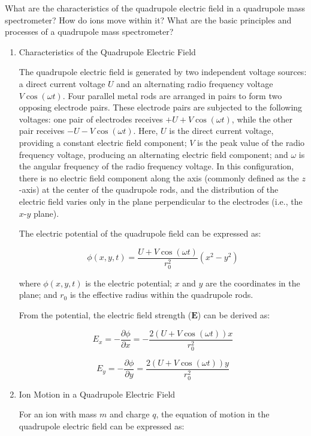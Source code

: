 \begin{question}
	What are the characteristics of the quadrupole electric field in a quadrupole mass spectrometer? How do ions move within it? What are the basic principles and processes of a quadrupole mass spectrometer?
\end{question}

\begin{enumerate}
	\item Characteristics of the Quadrupole Electric Field
	
	The quadrupole electric field is generated by two independent voltage sources: a direct current voltage \( U \) and an alternating radio frequency voltage \( V \cos(\omega t) \). Four parallel metal rods are arranged in pairs to form two opposing electrode pairs. These electrode pairs are subjected to the following voltages: one pair of electrodes receives \( +U + V \cos(\omega t) \), while the other pair receives \( -U - V \cos(\omega t) \). Here, \( U \) is the direct current voltage, providing a constant electric field component; \( V \) is the peak value of the radio frequency voltage, producing an alternating electric field component; and \( \omega \) is the angular frequency of the radio frequency voltage. In this configuration, there is no electric field component along the axis (commonly defined as the \( z \)-axis) at the center of the quadrupole rods, and the distribution of the electric field varies only in the plane perpendicular to the electrodes (i.e., the \( x \)-\( y \) plane).
	
	The electric potential of the quadrupole field can be expressed as:
	
	\[
	\phi(x, y, t) = \frac{U + V \cos(\omega t)}{r_0^2} \left( x^2 - y^2 \right)
	\]
	
	where \( \phi(x, y, t) \) is the electric potential; \( x \) and \( y \) are the coordinates in the plane; and \( r_0 \) is the effective radius within the quadrupole rods.
	
	From the potential, the electric field strength (\( \mathbf{E} \)) can be derived as:
	
	\[
	E_x = -\frac{\partial \phi}{\partial x} = -\frac{2(U + V \cos(\omega t))x}{r_0^2}
	\]
	
	\[
	E_y = -\frac{\partial \phi}{\partial y} = \frac{2(U + V \cos(\omega t))y}{r_0^2}
	\]
	
	\item Ion Motion in a Quadrupole Electric Field
	
	For an ion with mass \( m \) and charge \( q \), the equation of motion in the quadrupole electric field can be expressed as:
	

\end{enumerate}
